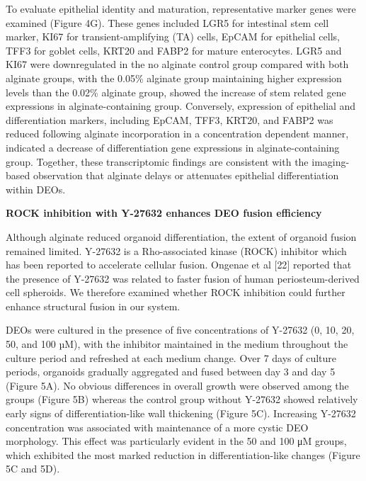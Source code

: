 \documentclass[
]{article}
\begin{document}
To evaluate epithelial identity and maturation, representative marker genes were examined (Figure 4G). These genes included LGR5 for intestinal stem cell marker, KI67 for transient-amplifying (TA) cells, EpCAM for epithelial cells, TFF3 for goblet cells, KRT20 and FABP2 for mature enterocytes. LGR5 and KI67 were downregulated in the no alginate control group compared with both alginate groups, with the 0.05\% alginate group maintaining higher expression levels than the 0.02\% alginate group, showed the increase of stem related gene expressions in alginate-containing group. Conversely, expression of epithelial and differentiation markers, including EpCAM, TFF3, KRT20, and FABP2 was reduced following alginate incorporation in a concentration dependent manner, indicated a decrease of differentiation gene expressions in alginate-containing group. Together, these transcriptomic findings are consistent with the imaging-based observation that alginate delays or attenuates epithelial differentiation within DEOs.

\textbf{ROCK inhibition with Y-27632 enhances DEO fusion efficiency}

Although alginate reduced organoid differentiation, the extent of organoid fusion remained limited. Y-27632 is a Rho-associated kinase (ROCK) inhibitor which has been reported to accelerate cellular fusion. Ongenae et al {[}22{]} reported that the presence of Y-27632 was related to faster fusion of human periosteum-derived cell spheroids. We therefore examined whether ROCK inhibition could further enhance structural fusion in our system.

DEOs were cultured in the presence of five concentrations of Y-27632 (0, 10, 20, 50, and 100 µM), with the inhibitor maintained in the medium throughout the culture period and refreshed at each medium change. Over 7 days of culture periods, organoids gradually aggregated and fused between day 3 and day 5 (Figure 5A). No obvious differences in overall growth were observed among the groups (Figure 5B) whereas the control group without Y-27632 showed relatively early signs of differentiation-like wall thickening (Figure 5C). Increasing Y-27632 concentration was associated with maintenance of a more cystic DEO morphology. This effect was particularly evident in the 50 and 100 μM groups, which exhibited the most marked reduction in differentiation-like changes (Figure 5C and 5D).
\end{document}
